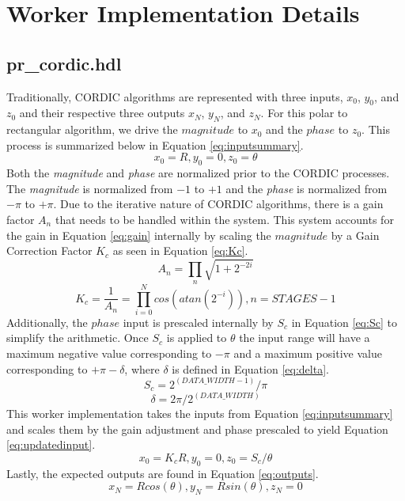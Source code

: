 \documentclass{article}
\def\comp{pr\_cordic}
\begin{document}
\section*{Worker Implementation Details}
\subsection*{\comp.hdl}
Traditionally, CORDIC algorithms are represented with three inputs, $x_0$, $y_0$, and $z_0$	and their respective three outputs $x_N$, $y_N$, and $z_N$. For this polar to rectangular algorithm, we drive the $magnitude$ to $x_0$ and the $phase$ to $z_0$. This process is summarized below in Equation \ref{eq:inputsummary}.
\begin{equation} \label{eq:inputsummary}
	x_{0}=R, y_{0}=0, z_{0}=\theta
\end{equation}
Both the \textit{magnitude} and \textit{phase} are normalized prior to the CORDIC processes. The  \textit{magnitude} is normalized from $-1$ to $+1$ and the \textit{phase} is normalized from $-\pi$ to $+\pi$. Due to the iterative nature of CORDIC algorithms, there is a gain factor $A_{n}$ that needs to be handled within the system. This system accounts for the gain in Equation \ref{eq:gain} internally by scaling the $magnitude$ by a Gain Correction Factor $K_c$ as seen in Equation \ref{eq:Kc}.
\begin{equation} \label{eq:gain}
	A_{n}=\prod_{n}\sqrt{1+2^{-2i}}
\end{equation}
\begin{equation}  \label{eq:Kc}
	K_{c}=\dfrac{1}{A_n}=\prod_{i=0}^Ncos(atan(2^{-i})), n=STAGES-1
\end{equation}
Additionally, the $phase$ input is prescaled internally by $S_c$ in Equation \ref{eq:Sc} to simplify the arithmetic. Once $S_c$ is applied to $\theta$ the input range will have a maximum negative value corresponding to $-\pi$ and a maximum positive value corresponding to $+\pi-\delta$, where $\delta$ is defined in Equation \ref{eq:delta}.
\begin{equation}  \label{eq:Sc}
	S_{c}=2^{(DATA\_WIDTH-1)}/\pi
\end{equation}
\begin{equation} \label{eq:delta}
	\delta = 2\pi/2^{(DATA\_WIDTH)}
\end{equation}
This worker implementation takes the inputs from Equation \ref{eq:inputsummary} and scales them by the gain adjustment and phase prescaled to yield Equation \ref{eq:updatedinput}.
\begin{equation} \label{eq:updatedinput}
	x_{0}=K_{c}R, y_{0}=0, z_{0}= S_{c}/ \theta
\end{equation}
Lastly, the expected outputs are found in Equation \ref{eq:outputs}.
\begin{equation} \label{eq:outputs}
	x_{N}=Rcos(\theta), y_{N}=Rsin(\theta), z_{N}=0
\end{equation}
\end{document}
